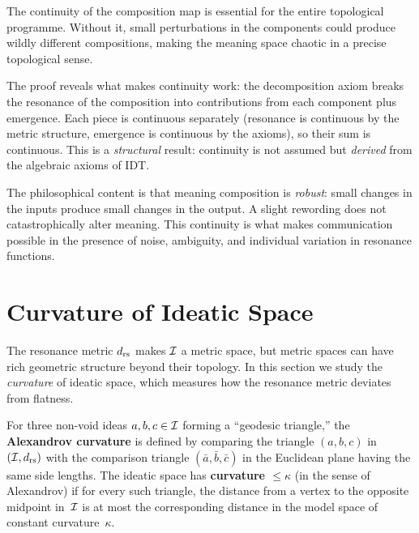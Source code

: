 \begin{remark}
The continuity of the composition map is essential for the entire
topological programme.  Without it, small perturbations in the
components could produce wildly different compositions, making
the meaning space chaotic in a precise topological sense.

The proof reveals what makes continuity work: the decomposition
axiom breaks the resonance of the composition into contributions
from each component plus emergence.  Each piece is continuous
separately (resonance is continuous by the metric structure,
emergence is continuous by the axioms), so their sum is continuous.
This is a \emph{structural} result: continuity is not assumed but
\emph{derived} from the algebraic axioms of IDT.

The philosophical content is that meaning composition is
\emph{robust}: small changes in the inputs produce small changes
in the output.  A slight rewording does not catastrophically
alter meaning.  This continuity is what makes communication
possible in the presence of noise, ambiguity, and individual
variation in resonance functions.
\end{remark}

\section{Curvature of Ideatic Space}
\label{sec:curvature}

The resonance metric $d_{\mathrm{rs}}$ makes $\mathcal{I}$ a metric space, but metric
spaces can have rich geometric structure beyond their topology.  In
this section we study the \emph{curvature} of ideatic space, which
measures how the resonance metric deviates from flatness.

\begin{definition}
\label{def:sectional-curvature}
For three non-void ideas $a, b, c \in \mathcal{I}$ forming a ``geodesic
triangle,'' the \textbf{Alexandrov curvature} is defined by comparing
the triangle $(a,b,c)$ in $(\mathcal{I}, d_{\mathrm{rs}})$ with the comparison triangle
$(\bar{a}, \bar{b}, \bar{c})$ in the Euclidean plane having the same
side lengths.  The ideatic space has \textbf{curvature $\le \kappa$}
(in the sense of Alexandrov) if for every such triangle, the distance
from a vertex to the opposite midpoint in~$\mathcal{I}$ is at most the
corresponding distance in the model space of constant curvature~$\kappa$.
\end{definition}

